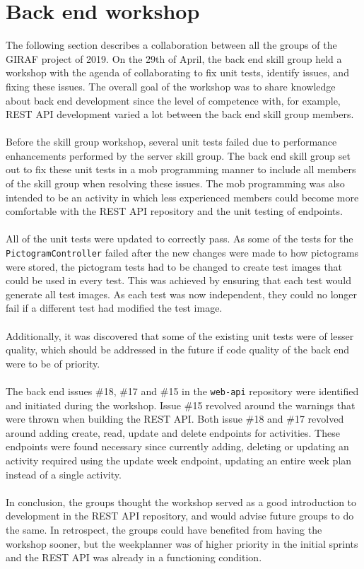 \section{Back end workshop}\label{collab:back-end}
The following section describes a collaboration between all the groups of the GIRAF project of 2019. 
On the 29th of April, the back end skill group held a workshop with the agenda of collaborating to fix unit tests, identify issues, and fixing these issues. 
The overall goal of the workshop was to share knowledge about back end development since the level of competence with, for example, REST API development varied a lot between the back end skill group members.
\\\\
Before the skill group workshop, several unit tests failed due to performance enhancements performed by the server skill group.
The back end skill group set out to fix these unit tests in a mob programming manner to include all members of the skill group when resolving these issues.
The mob programming was also intended to be an activity in which less experienced members could become more comfortable with the REST API repository and the unit testing of endpoints.
\\\\
All of the unit tests were updated to correctly pass.
As some of the tests for the \texttt{PictogramController} failed after the new changes were made to how pictograms were stored, the pictogram tests had to be changed to create test images that could be used in every test.
This was achieved by ensuring that each test would generate all test images.
As each test was now independent, they could no longer fail if a different test had modified the test image.
\\\\
Additionally, it was discovered that some of the existing unit tests were of lesser quality, which should be addressed in the future if code quality of the back end were to be of priority.
\\\\
The back end issues \#18, \#17 and \#15 in the \texttt{web-api} repository were identified and initiated during the workshop.
Issue \#15 revolved around the warnings that were thrown when building the REST API.
Both issue \#18 and \#17 revolved around adding create, read, update and delete endpoints for activities.
These endpoints were found necessary since currently adding, deleting or updating an activity required using the update week endpoint, updating an entire week plan instead of a single activity. 
\\\\
In conclusion, the groups thought the workshop served as a good introduction to development in the REST API repository, and would advise future groups to do the same.
In retrospect, the groups could have benefited from having the workshop sooner, but the weekplanner was of higher priority in the initial sprints and the REST API was already in a functioning condition.
